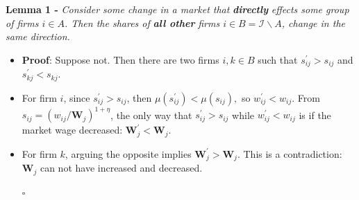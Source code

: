 \documentclass[12pt]{article}
\theoremstyle{prop}
\begin{document}
\bigskip

\textbf{Lemma 1 - }\emph{Consider some change in a market that }\textbf{\emph{directly
}}\emph{effects some group of firms $i\in A$. Then the shares of
}\textbf{\emph{all other}}\emph{ firms $i\in B=\mathcal{I}\backslash A$,
	change in the same direction.}
\begin{itemize}
	\item \textbf{Proof}: Suppose not. Then there are two firms $i,k\in B$
	such that $s_{ij}^{\prime}>s_{ij}$ and $s_{kj}^{\prime}<s_{kj}$.
	\item For firm $i$, since $s_{ij}^{\prime}>s_{ij}$, then $\mu\left(s_{ij}^{\prime}\right)<\mu\left(s_{ij}\right),$
	so $w_{ij}^{\prime}<w_{ij}$. From $s_{ij}=\left(w_{ij}/\mathbf{W}_{j}\right)^{1+\eta}$,
	the only way that $s_{ij}^{\prime}>s_{ij}$ while $w_{ij}^{\prime}<w_{ij}$
	is if the market wage decreased: $\mathbf{W}_{j}^{\prime}<\mathbf{W}_{j}$.
	\item For firm $k$, arguing the opposite implies $\mathbf{W}_{j}^{\prime}>\mathbf{W}_{j}$.
	This is a contradiction: $\mathbf{W}_{j}$ can not have increased
	and decreased. 
 \begin{flushright}
      $\square$
 \end{flushright}

\end{itemize}

\bigskip
\end{document}
